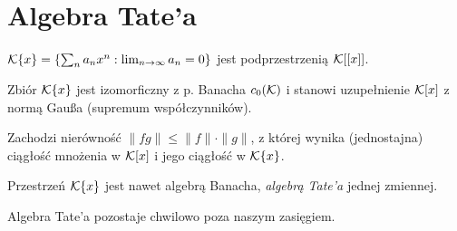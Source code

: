 \section{Algebra Tate'a}
\begin{definicja}
	$\mathcal K\{x\} = \{\sum_n a_n x^n : \lim_{n \to \infty} a_n = 0\}$ jest podprzestrzenią $\mathcal K[[x]]$.
\end{definicja}

\begin{fakt}
	Zbiór $\mathcal K\{x\}$ jest izomorficzny z p. Banacha $c_0(\mathcal K)$ i stanowi uzupełnienie $\mathcal K[x]$ z normą Gaußa (supremum współczynników).
\end{fakt}

Zachodzi nierówność $\|fg\| \le \|f\| \cdot \|g\|$, z której wynika (jednostajna) ciągłość mnożenia w $\mathcal K[x]$ i jego ciągłość w $\mathcal K\{x\}$.

\begin{fakt}
	Przestrzeń $\mathcal K\{x\}$ jest nawet algebrą Banacha, \emph{algebrą Tate'a} jednej zmiennej.
\end{fakt}

Algebra Tate'a pozostaje chwilowo poza naszym zasięgiem. 